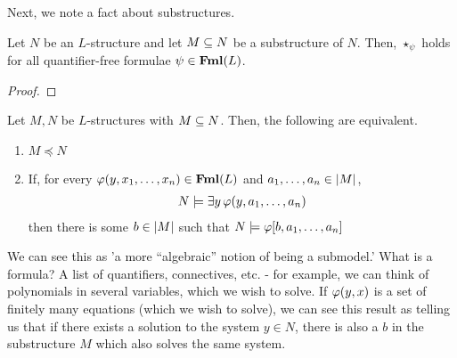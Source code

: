 Next, we note a fact about substructures.

\begin{boxlemma}\label{Ch1:Lemma:Tarski-Vaught-star-psi}
    Let $N$ be an $L$-structure and let $M \subseteq N$ be a substructure of $N$. Then, $\star_{\psi}$ holds for all quantifier-free formulae $\psi \in \mathbf{Fml}(L)$.
\end{boxlemma}
\begin{proof}
    \sorry
\end{proof}

\begin{boxtheorem}\label{Ch1:Thm:Tarski-Vaught}
    Let $M, N$ be $L$-structures with $M \subseteq N$. Then, the following are equivalent.
    \begin{enumerate}
        \item $M \preceq N$
        \item If, for every $\varphi\!\left( y, x_1, \ldots, x_n \right) \in \mathbf{Fml}(L)$ and $a_1, \ldots, a_n \in \left\lvert M \right\rvert$,
        \begin{align*}
            N \models \exists y \, \varphi\!\left( y ,a_1, \ldots, a_n \right)
        \end{align*}
        then there is some $b \in \left\lvert M \right\rvert$ such that $N \models \varphi\!\left[ b, a_1, \ldots, a_n \right]$
    \end{enumerate}
\end{boxtheorem}
\begin{remark}
    We can see this as 'a more ``algebraic'' notion of being a submodel.' What is a formula? A list of quantifiers, connectives, etc. - for example, we can think of polynomials in several variables, which we wish to solve. If $\varphi(y,x)$ is a set of finitely many equations (which we wish to solve), we can see this result as telling us that if there exists a solution to the system $y\in N$, there is also a $b$ in the substructure $M$ which also solves the same system. 
\end{remark}
